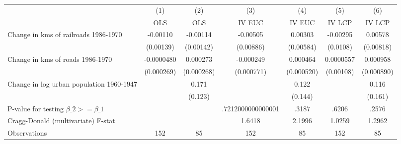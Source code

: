 {
\def\sym#1{\ifmmode^{#1}\else\(^{#1}\)\fi}
\begin{tabular}{l*{6}{c}}
\hline\hline
                &\multicolumn{1}{c}{(1)}&\multicolumn{1}{c}{(2)}&\multicolumn{1}{c}{(3)}&\multicolumn{1}{c}{(4)}&\multicolumn{1}{c}{(5)}&\multicolumn{1}{c}{(6)}\\
                &\multicolumn{1}{c}{OLS}&\multicolumn{1}{c}{OLS}&\multicolumn{1}{c}{IV EUC}&\multicolumn{1}{c}{IV EUC}&\multicolumn{1}{c}{IV LCP}&\multicolumn{1}{c}{IV LCP}\\
\hline
Change in kms of railroads 1986-1970& -0.00110         & -0.00114         & -0.00505         &  0.00303         & -0.00295         &  0.00578         \\
                &(0.00139)         &(0.00142)         &(0.00886)         &(0.00584)         & (0.0108)         &(0.00818)         \\
[1em]
Change in kms of roads 1986-1970&-0.0000480         & 0.000273         &-0.000249         & 0.000464         &0.0000557         & 0.000958         \\
                &(0.000269)         &(0.000268)         &(0.000771)         &(0.000520)         &(0.00108)         &(0.000890)         \\
[1em]
Change in log urban population 1960-1947&                  &    0.171         &                  &    0.122         &                  &    0.116         \\
                &                  &  (0.123)         &                  &  (0.144)         &                  &  (0.161)         \\
\hline
P-value for testing $\beta\_{2} >= \beta\_{1}$&                  &                  &.7212000000000001         &    .3187         &    .6206         &    .2576         \\
Cragg-Donald (multivariate) F-stat&                  &                  &   1.6418         &   2.1996         &   1.0259         &   1.2962         \\
Observations    &      152         &       85         &      152         &       85         &      152         &       85         \\
\hline\hline
\end{tabular}
}
